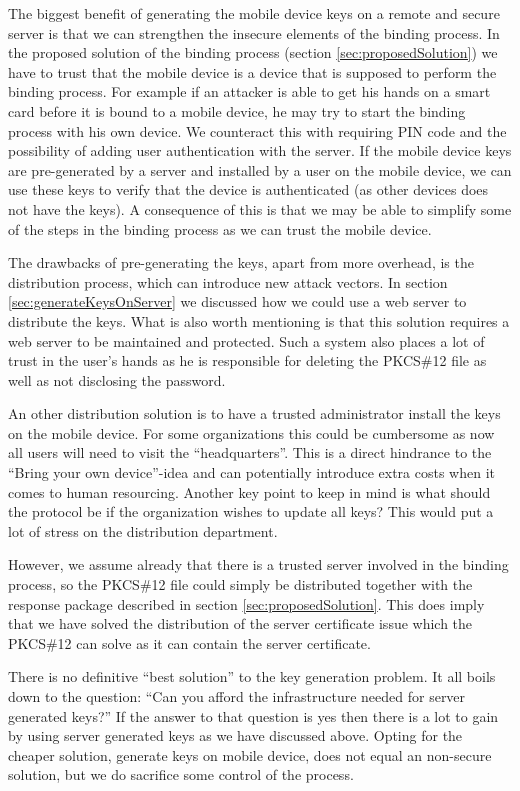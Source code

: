 The biggest benefit of generating the mobile device keys on a remote and secure server is that we can strengthen the insecure elements of the binding process. In the proposed solution of the binding process (section \ref{sec:proposedSolution}) we have to trust that the mobile device is a device that is supposed to perform the binding process. For example if an attacker is able to get his hands on a smart card before it is bound to a mobile device, he may try to start the binding process with his own device. We counteract this with requiring PIN code and the possibility of adding user authentication with the server. If the mobile device keys are pre-generated by a server and installed by a user on the mobile device, we can use these keys to verify that the device is authenticated (as other devices does not have the keys). A consequence of this is that we may be able to simplify some of the steps in the binding process as we can trust the mobile device.

The drawbacks of pre-generating the keys, apart from more overhead, is the distribution process, which can introduce new attack vectors. In section \ref{sec:generateKeysOnServer} we discussed how we could use a web server to distribute the keys. What is also worth mentioning is that this solution requires a web server to be maintained and protected. Such a system also places a lot of trust in the user's hands as he is responsible for deleting the PKCS\#12 file as well as not disclosing the password.

An other distribution solution is to have a trusted administrator install the keys on the mobile device. For some organizations this could be cumbersome as now all users will need to visit the ``headquarters''. This is a direct hindrance to the ``Bring your own device''-idea and can potentially introduce extra costs when it comes to human resourcing. Another key point to keep in mind is what should the protocol be if the organization wishes to update all keys? This would put a lot of stress on the distribution department.

However, we assume already that there is a trusted server involved in the binding process, so the PKCS\#12 file could simply be distributed together with the response package described in section \ref{sec:proposedSolution}. This does imply that we have solved the distribution of the server certificate issue which the PKCS\#12 can solve as it can contain the server certificate.

There is no definitive ``best solution'' to the key generation problem. It all boils down to the question: ``Can you afford the infrastructure needed for server generated keys?'' If the answer to that question is yes then there is a lot to gain by using server generated keys as we have discussed above. Opting for the cheaper solution, generate keys on mobile device, does not equal an non-secure solution, but we do sacrifice some control of the process.

